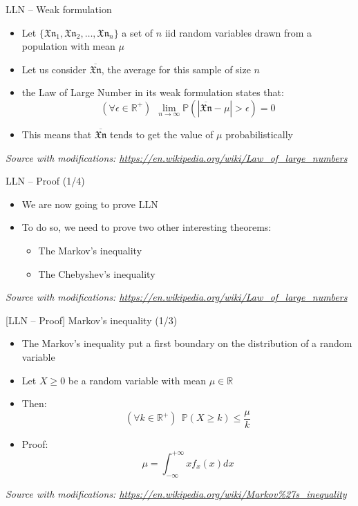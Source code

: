 \documentclass{beamer}
\begin{document}
\begin{frame}
{\centerline{LLN -- Weak formulation}}

\begin{itemize}
\item Let $\{ \mathfrak{Xn}_1, \mathfrak{Xn}_2, \ldots{}, \mathfrak{Xn}_n\}$ a set of $n$ iid random variables drawn from a population with mean $\mu$
\item Let us consider $\overline{\mathfrak{Xn}}$, the average for this sample of size $n$ 
\item the Law of Large Number in its weak formulation states that:
$$(\forall \epsilon \in \mathbb{R}^+) ~~ \lim_{n \to \infty} \mathbb{P} ( | \overline{\mathfrak{Xn}} - \mu |  > \epsilon ) = 0$$
\item This means that $\overline{\mathfrak{Xn}}$ tends to get the value of $\mu$ probabilistically

\end{itemize}

\textit{\small
Source with modifications: \url{https://en.wikipedia.org/wiki/Law_of_large_numbers}}
\end{frame}


\begin{frame}
{\centerline{LLN -- Proof (1/4)}}

\begin{itemize}
\item We are now going to prove LLN\\
\item To do so, we need to prove two other interesting theorems:
\begin{itemize}
\item The Markov's inequality\\
\item The Chebyshev's inequality
\end{itemize}

\end{itemize}

\textit{\small
Source with modifications: \url{https://en.wikipedia.org/wiki/Law_of_large_numbers}}
\end{frame}

\begin{frame}
{\centerline{[LLN -- Proof] Markov's inequality (1/3)}}

\begin{itemize}
\item The Markov's inequality put a first boundary on the distribution of a random variable
\item Let $X \geq 0$ be a random variable with mean $\mu \in \mathbb{R}$
\item Then:
$$ (\forall k \in \mathbb{R}^+) ~~  \mathbb{P} ( X  \geq k) \leq \frac{\mu}{k} $$
\item Proof:
$$ \mu = \int_{- \infty }^{+ \infty} xf_x(x)dx$$
\end{itemize}
 
\textit{\small
Source with modifications: \url{https://en.wikipedia.org/wiki/Markov\%27s_inequality}}

\end{frame}
\end{document}
